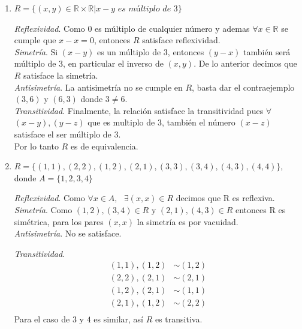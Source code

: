 \documentclass[12pt]{article}
\begin{document}
\begin{enumerate}[label=\alph*)]
    \item $R = \{(x,y) \in \mathbb{R} \times \mathbb{R} | x-y \textit{ es múltiplo de 3}\}$

    \textit{Reflexividad}. Como $0$ es múltiplo de cualquier número y ademas $\forall x \in \mathbb{R}$ se cumple que $x-x = 0$, entonces $R$ satisface reflexividad.\\

    \textit{Simetría}. Si $(x-y)$ es un múltiplo de $3$, entonces $(y-x)$ también será múltiplo de $3$, en particular el inverso de $(x,y)$. De lo
    anterior decimos que $R$ satisface la simetría.\\

    \textit{Antisimetría}. La antisimetría no se cumple en $R$, basta dar el contraejemplo $(3,6)$ y $(6,3)$ donde $3 \neq 6$.\\

    \textit{Transitividad}. Finalmente, la relación satisface la transitividad pues $\forall$ $(x-y), (y-z)$ que es multiplo de $3$, también el número $(x-z)$ satisface
    el ser múltiplo de 3.\\

    Por lo tanto $R$ es de equivalencia.

    \item $R = \{(1,1),(2,2),(1,2),(2,1),(3,3),(3,4),(4,3),(4,4)\}$, donde $A = \{1,2,3,4\}$

    \textit{Reflexividad}. Como $\forall x \in A, \text{ } \exists (x,x) \in R$ decimos que R es reflexiva.\\ 

    \textit{Simetría}. Como $(1,2), (3,4) \in R$  y $(2,1), (4,3) \in R$ entonces R es simétrica, para los pares $(x,x)$ la simetría es por
    vacuidad.\\

    \textit{Antisimetría}. No se satisface.

    \textit{Transitividad}. 
    \begin{align*}
        (1,1), (1,2)&\sim (1,2)\\
        (2,2), (2,1)&\sim (2,1)\\
        (1,2), (2,1)&\sim (1,1)\\
        (2,1), (1,2)&\sim (2,2)\\
    \end{align*}
    Para el caso de $3$ y $4$ es similar, así $R$ es transitiva.\\
    

\end{enumerate}
\end{document}
